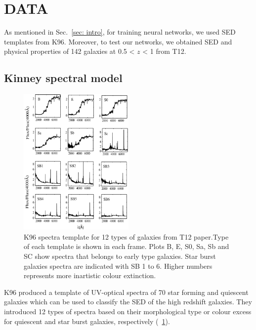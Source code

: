 
\section{DATA}
\label{sec: data}
As mentioned in Sec.~\ref{sec: intro}, for training neural networks, we used SED templates from K96.
Moreover, to test our networks, we obtained SED and physical properties of 142 galaxies at 0.5 < $z$ < 1 from T12.
 \subsection{Kinney spectral model}
     \begin{figure}
        \centering
        \includegraphics[width=0.5\textwidth]{../images/k96.jpg}
        \caption{K96 spectra template for 12 types of galaxies from T12 paper.Type of each template is shown in each frame. Plots B, E, S0, Sa, Sb and SC show spectra that belongs to early type galaxies. Star burst galaxies spectra are indicated with SB 1 to 6. Higher numbers represents more inartistic colour extinction.}
        \label{fig: k96}
    \end{figure}
    K96 produced a template of UV-optical spectra of 70 star forming and quiescent galaxies which can be used to classify the SED of the high redshift galaxies.
    They introduced 12 types of spectra based on their morphological type or colour excess for quiescent and star burst galaxies, respectively (~\ref{fig: k96}).

